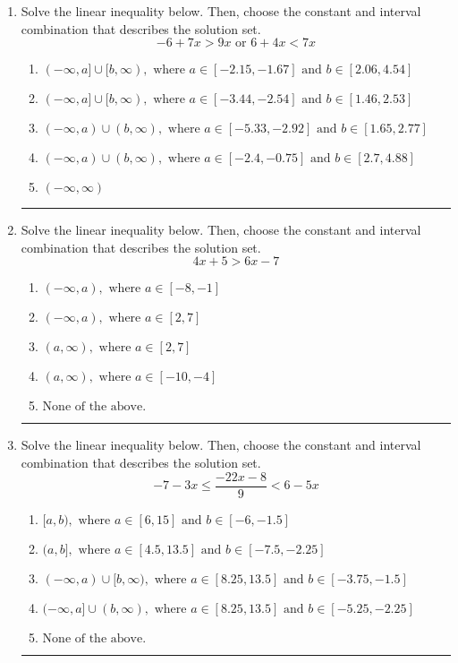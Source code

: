\documentclass[14pt]{extbook}
\newcommand{\litem}[1]{\item#1\hspace*{-1cm}\rule{\textwidth}{0.4pt}}
\begin{document}
\begin{enumerate}
{\begin{enumerate}[label=\Alph*.]
\end{enumerate} }
\litem{
Solve the linear inequality below. Then, choose the constant and interval combination that describes the solution set.\[ -6 + 7 x > 9 x \text{ or } 6 + 4 x < 7 x \]\begin{enumerate}[label=\Alph*.]
\item \( (-\infty, a] \cup [b, \infty), \text{ where } a \in [-2.15, -1.67] \text{ and } b \in [2.06, 4.54] \)
\item \( (-\infty, a] \cup [b, \infty), \text{ where } a \in [-3.44, -2.54] \text{ and } b \in [1.46, 2.53] \)
\item \( (-\infty, a) \cup (b, \infty), \text{ where } a \in [-5.33, -2.92] \text{ and } b \in [1.65, 2.77] \)
\item \( (-\infty, a) \cup (b, \infty), \text{ where } a \in [-2.4, -0.75] \text{ and } b \in [2.7, 4.88] \)
\item \( (-\infty, \infty) \)

\end{enumerate} }
\litem{
Solve the linear inequality below. Then, choose the constant and interval combination that describes the solution set.\[ 4x + 5 > 6x -7 \]\begin{enumerate}[label=\Alph*.]
\item \( (-\infty, a), \text{ where } a \in [-8, -1] \)
\item \( (-\infty, a), \text{ where } a \in [2, 7] \)
\item \( (a, \infty), \text{ where } a \in [2, 7] \)
\item \( (a, \infty), \text{ where } a \in [-10, -4] \)
\item \( \text{None of the above}. \)

\end{enumerate} }
\litem{
Solve the linear inequality below. Then, choose the constant and interval combination that describes the solution set.\[ -7 - 3 x \leq \frac{-22 x - 8}{9} < 6 - 5 x \]\begin{enumerate}[label=\Alph*.]
\item \( [a, b), \text{ where } a \in [6, 15] \text{ and } b \in [-6, -1.5] \)
\item \( (a, b], \text{ where } a \in [4.5, 13.5] \text{ and } b \in [-7.5, -2.25] \)
\item \( (-\infty, a) \cup [b, \infty), \text{ where } a \in [8.25, 13.5] \text{ and } b \in [-3.75, -1.5] \)
\item \( (-\infty, a] \cup (b, \infty), \text{ where } a \in [8.25, 13.5] \text{ and } b \in [-5.25, -2.25] \)
\item \( \text{None of the above.} \)


\end{enumerate}}
\end{enumerate}
\end{document}
